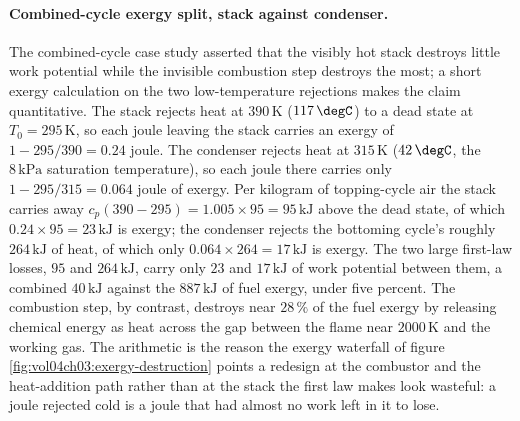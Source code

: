 \paragraph{Combined-cycle exergy split, stack against condenser.} The
combined-cycle case study asserted that the visibly hot stack destroys little work
potential while the invisible combustion step destroys the most; a short exergy
calculation on the two low-temperature rejections makes the claim quantitative.
The stack rejects heat at $390\,\si{\kelvin}$ ($117\,\degC$) to a dead state at
$T_0 = 295\,\si{\kelvin}$, so each joule leaving the stack carries an exergy of
$1 - 295/390 = 0.24$ joule. The condenser rejects heat at $315\,\si{\kelvin}$
($42\,\degC$, the $8\,\text{kPa}$ saturation temperature), so each joule there
carries only $1 - 295/315 = 0.064$ joule of exergy. Per kilogram of topping-cycle
air the stack carries away $c_p(390 - 295) = 1.005 \times 95 = 95\,\text{kJ}$
above the dead state, of which $0.24 \times 95 = 23\,\text{kJ}$ is exergy; the
condenser rejects the bottoming cycle's roughly $264\,\text{kJ}$ of heat, of which
only $0.064 \times 264 = 17\,\text{kJ}$ is exergy. The two large first-law losses,
$95$ and $264\,\text{kJ}$, carry only $23$ and $17\,\text{kJ}$ of work potential
between them, a combined $40\,\text{kJ}$ against the $887\,\text{kJ}$ of fuel
exergy, under five percent. The combustion step, by contrast, destroys near
$28\,\%$ of the fuel exergy by releasing chemical energy as heat across the gap
between the flame near $2000\,\si{\kelvin}$ and the working gas. The arithmetic is
the reason the exergy waterfall of figure \ref{fig:vol04ch03:exergy-destruction}
points a redesign at the combustor and the heat-addition path rather than at the
stack the first law makes look wasteful: a joule rejected cold is a joule that had
almost no work left in it to lose.


